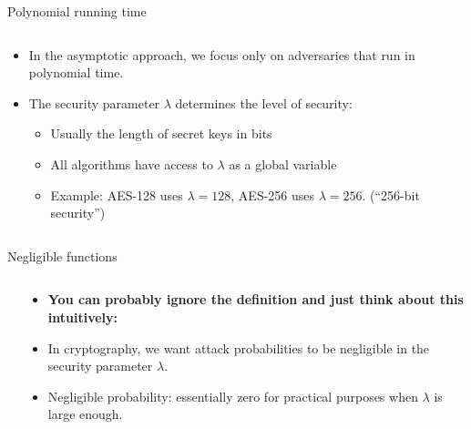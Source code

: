 \documentclass[aspectratio=169, lualatex, handout]{beamer}
\begin{document}
\begin{frame}{Polynomial running time}
	\begin{columns}[c]
		\begin{column}{0.5\textwidth}
			\begin{itemize}
				\item In the asymptotic approach, we focus only on adversaries that run in polynomial time.
				\item The security parameter $\lambda$ determines the level of security:
				      \begin{itemize}
					      \item Usually the length of secret keys in bits
					      \item All algorithms have access to $\lambda$ as a global variable
					      \item Example: AES-128 uses $\lambda = 128$, AES-256 uses $\lambda = 256$. (``256-bit security'')
				      \end{itemize}
			\end{itemize}
		\end{column}
		\begin{column}{0.5\textwidth}
		\end{column}
	\end{columns}
\end{frame}

\begin{frame}{Negligible functions}
	\begin{columns}[c]
		\begin{column}{0.5\textwidth}
		\end{column}
		\begin{column}{0.5\textwidth}
			\begin{itemize}
				\item \textbf{You can probably ignore the definition and just think about this intuitively:}
				\item In cryptography, we want attack probabilities to be negligible in the security parameter $\lambda$.
				\item Negligible probability: essentially zero for practical purposes when $\lambda$ is large enough.
			\end{itemize}
		\end{column}
	\end{columns}
\end{frame}
\end{document}
